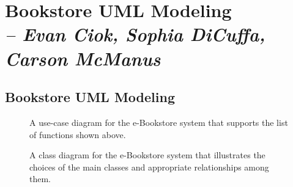 \chapter{Bookstore UML Modeling \\
  \small{\textit{-- Evan Ciok, Sophia DiCuffa, Carson McManus}}
  \label{Chapter::LabOne}}

\section{Bookstore UML Modeling \label{Section::LabOne}}

\begin{figure}
  \centering
  \caption{\label{Figure::bookstoreUseCase} A use-case diagram for the e-Bookstore system that supports the list of functions shown above.}
\end{figure}

\begin{figure}
  \centering
  \caption{\label{Figure::bookstoreUML} A class diagram for the e-Bookstore system that illustrates the choices of the main classes and
    appropriate relationships among them.}
\end{figure}

